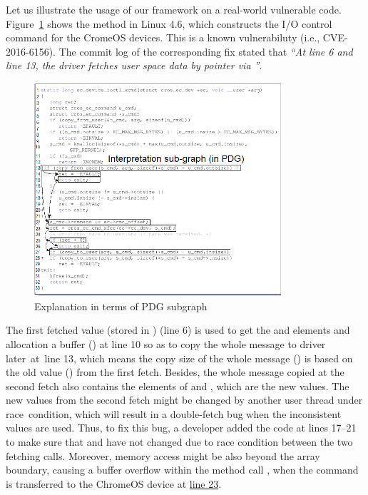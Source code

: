 Let us illustrate the usage of our framework on a real-world vulnerable code. Figure~\ref{fig:pdg} shows the
method  in Linux 4.6, which
constructs the I/O control command for the CromeOS devices. This is a
known vulnerabiluty (i.e., CVE-2016-6156). The commit log of the
corresponding fix stated that {\em ``At line 6 and line 13, the driver
  fetches user space data by pointer  via
  ''}.


\begin{figure}
	\centering
	\includegraphics[width=3.6in]{pdg-2.png}
	\caption{Explanation in terms of PDG subgraph}
	\label{fig:pdg}
\end{figure}

The first fetched value (stored in ) (line 6) is used
to get the  and  elements and
allocation a buffer () at line 10 so as to copy the
whole message to driver later~at~line 13, which means the copy size of
the whole message () is based on the old value
() from the first fetch. Besides, the whole
message copied at the second fetch also contains the elements of
 and , which are the new
values. The new values from the second fetch might be changed by
another user thread under race~condition, which will result in a
double-fetch bug when the inconsistent values are used.
%
Thus, to fix this bug, a developer added the code at lines 17--21 to make sure that  and  have not changed due to race condition between the two fetching calls. Moreover, memory access might be also beyond the array boundary, causing a buffer overflow within the method call , when the command is transferred to the ChromeOS device at \underline{line 23}.

